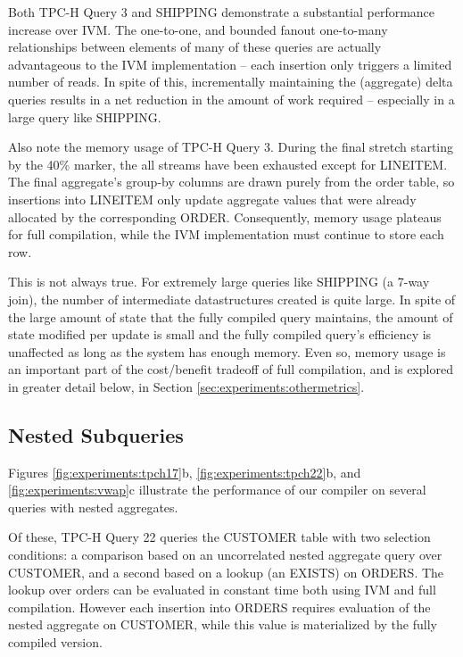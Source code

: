 Both TPC-H Query 3 and SHIPPING demonstrate a substantial performance increase over IVM.  The one-to-one, and bounded fanout one-to-many relationships between elements of many of these queries are actually advantageous to the IVM implementation -- each insertion only triggers a limited number of reads.  In spite of this, incrementally maintaining the (aggregate) delta queries results in a net reduction in the amount of work required -- especially in a large query like SHIPPING.

Also note the memory usage of TPC-H Query 3.  During the final stretch starting by the 40\% marker, the all streams have been exhausted except for LINEITEM.  The final aggregate's group-by columns are drawn purely from the order table, so insertions into LINEITEM only update aggregate values that were already  allocated by the corresponding ORDER.  Consequently, memory usage plateaus for full compilation, while the IVM implementation must continue to store each row.

This is not always true.  For extremely large queries like SHIPPING (a 7-way join), the number of intermediate datastructures created is quite large.  In spite of the large amount of state that the fully compiled query maintains, the amount of state modified per update is small and the fully compiled query's efficiency is unaffected as long as the system has enough memory.  Even so, memory usage is an important part of the cost/benefit tradeoff of full compilation, and is explored in greater detail below, in Section \ref{sec:experiments:othermetrics}.

\subsection{Nested Subqueries}

Figures \ref{fig:experiments:tpch17}b, \ref{fig:experiments:tpch22}b, and \ref{fig:experiments:vwap}c illustrate the performance of our compiler on several queries with nested aggregates.

Of these, TPC-H Query 22 queries the CUSTOMER table with two selection conditions: a comparison based on an uncorrelated nested aggregate query over CUSTOMER, and a second based on a lookup (an EXISTS) on ORDERS.  The lookup over orders can be evaluated in constant time both using IVM and full compilation.  However each insertion into ORDERS requires evaluation of the nested aggregate on CUSTOMER, while this value is materialized by the fully compiled version.  

